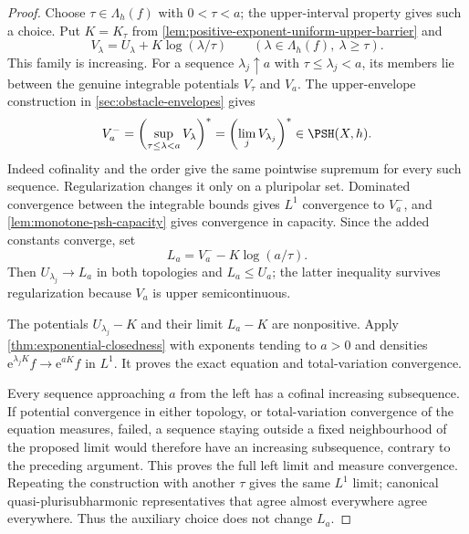 \begin{proof}
Choose $\tau\in\Lambda_h(f)$ with $0<\tau<a$; the upper-interval property gives such a choice. Put $K=K_\tau$ from \cref{lem:positive-exponent-uniform-upper-barrier} and
\[
 V_\lambda=U_\lambda+K\log(\lambda/\tau)
       \qquad(\lambda\in\Lambda_h(f),\ \lambda\geq\tau).
\]
This family is increasing. For a sequence $\lambda_j\uparrow a$ with $\tau\leq\lambda_j<a$, its members lie between the genuine integrable potentials $V_\tau$ and $V_a$. The upper-envelope construction in \cref{sec:obstacle-envelopes} gives
\[
 V^-_a=\left(\sup_{\tau\leq\lambda<a}V_\lambda\right)^*
        =\left(\lim_jV_{\lambda_j}\right)^*\in\PSH(X,h).
\]
Indeed cofinality and the order give the same pointwise supremum for every such sequence. Regularization changes it only on a pluripolar set. Dominated convergence between the integrable bounds gives $L^1$ convergence to $V^-_a$, and \cref{lem:monotone-psh-capacity} gives convergence in capacity. Since the added constants converge, set
\[
 L_a=V^-_a-K\log(a/\tau).
\]
Then $U_{\lambda_j}\to L_a$ in both topologies and $L_a\leq U_a$; the latter inequality survives regularization because $V_a$ is upper semicontinuous.

The potentials $U_{\lambda_j}-K$ and their limit $L_a-K$ are nonpositive. Apply \cref{thm:exponential-closedness} with exponents tending to $a>0$ and densities $\mathrm e^{\lambda_jK}f\to\mathrm e^{aK}f$ in $L^1$. It proves the exact equation and total-variation convergence.

Every sequence approaching $a$ from the left has a cofinal increasing subsequence. If potential convergence in either topology, or total-variation convergence of the equation measures, failed, a sequence staying outside a fixed neighbourhood of the proposed limit would therefore have an increasing subsequence, contrary to the preceding argument. This proves the full left limit and measure convergence. Repeating the construction with another $\tau$ gives the same $L^1$ limit; canonical quasi-plurisubharmonic representatives that agree almost everywhere agree everywhere. Thus the auxiliary choice does not change $L_a$.
\end{proof}

